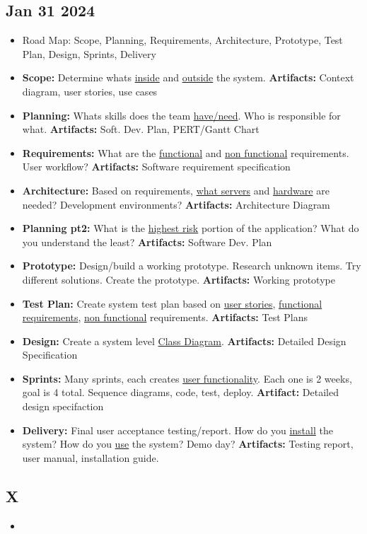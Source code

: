 \documentclass[12pt]{article}
\begin{document}
\subsection{Jan 31 2024}

\begin{itemize}
		  \item Road Map: Scope, Planning, Requirements, Architecture, Prototype, Test Plan, Design, Sprints, Delivery
		  \item \textbf{Scope:} Determine whats \underline{inside} and \underline{outside} the system. 
					 \textbf{Artifacts:} Context diagram, user stories, use cases
		  \item \textbf{Planning:} Whats skills does the team \underline{have/need}. Who is responsible for what. 
					 \textbf{Artifacts:} Soft. Dev. Plan, PERT/Gantt Chart
		  \item \textbf{Requirements:} What are the \underline{functional} and \underline{non functional} 
					 requirements. User workflow? \textbf{Artifacts:} Software requirement specification
		  \item \textbf{Architecture:} Based on requirements, \underline{what servers} and \underline{hardware} are needed? 
					 Development environments? \textbf{Artifacts:} Architecture Diagram
		  \item \textbf{Planning pt2:} What is the \underline{highest risk} portion of the application? What do you understand
					 the least? \textbf{Artifacts:} Software Dev. Plan
		  \item \textbf{Prototype:} Design/build a working prototype. Research unknown items. Try different solutions. 
					 Create the prototype. \textbf{Artifacts:} Working prototype
		  \item \textbf{Test Plan:} Create system test plan based on \underline{user stories},
					 \underline{functional requirements}, \underline{non functional}
					 requirements. \textbf{Artifacts:} Test Plans
		  \item \textbf{Design:} Create a system level \underline{Class Diagram}. \textbf{Artifacts:} 
					 Detailed Design Specification
		  \item \textbf{Sprints:} Many sprints, each creates \underline{user functionality}. Each one is 2 weeks, goal is 4 total.
					 Sequence diagrams, code, test, deploy. \textbf{Artifact:} Detailed design specifaction
		  \item \textbf{Delivery:} Final user acceptance testing/report. How do you \underline{install} the system?
					 How do you \underline{use} the system? Demo day? \textbf{Artifacts:} Testing report, user manual, installation
					 guide.
\end{itemize}

\subsection{X}

\begin{itemize}
		  \item 
\end{itemize}
\end{document}
